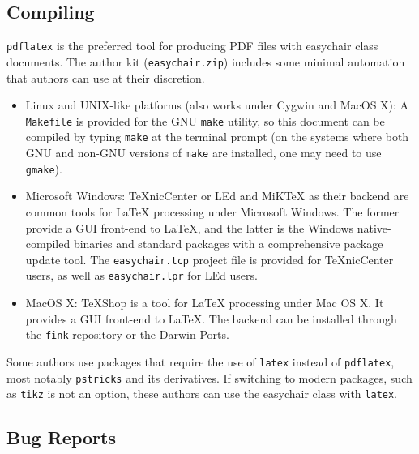 \documentclass{easychair}
\newcommand{\easychair}{\textsf{easychair}}
\newcommand{\miktex}{MiK{\TeX}}
\newcommand{\texniccenter}{{\TeX}nicCenter}
\newcommand{\makefile}{\texttt{Makefile}}
\newcommand{\latexeditor}{LEd}
\begin{document}
\subsection{Compiling}
\label{sect:compiling}

\texttt{pdflatex} \cite{pdflatex-instructions} is the preferred tool for
producing PDF files with {\easychair} class documents.
The author kit (\texttt{easychair.zip}) includes some minimal automation 
that authors can use at their discretion.

\begin{itemize}
\item
Linux and UNIX-like platforms (also works under Cygwin and MacOS X):
A {\makefile} is provided for the GNU \texttt{make} \cite{gmake} utility,
so this document can be compiled by typing \texttt{make} at the terminal 
prompt (on the systems where both GNU and non-GNU versions of \texttt{make} 
are installed, one may need to use \texttt{gmake}).

\item
Microsoft Windows:
{\texniccenter} \cite{texniccenter} or {\latexeditor} \cite{led} and
{\miktex} \cite{miktex} as their backend are common tools
for {\LaTeX} processing under Microsoft Windows. 
The former provide a GUI front-end to {\LaTeX}, and the latter is the 
Windows native-compiled binaries and standard packages with 
a comprehensive package update tool. 
The \texttt{easychair.tcp} project file is provided for {\texniccenter} users,
as well as \texttt{easychair.lpr} for {\latexeditor} users.

\item
MacOS X:
TeXShop \cite{texshop} is a tool for {\LaTeX} processing under Mac OS X.
It provides a GUI front-end to {\LaTeX}. The backend can be installed
through the \texttt{fink} \cite{fink} repository or the Darwin Ports.
\end{itemize}

Some authors use packages that require the use of \texttt{latex}
instead of \texttt{pdflatex}, most notably \texttt{pstricks} and its
derivatives. If switching to modern packages, such as
\texttt{tikz} is not an option, these authors can use the {\easychair}
class with \texttt{latex}. 

\subsection{Bug Reports}
\label{sec:bug-reports}
\end{document}
